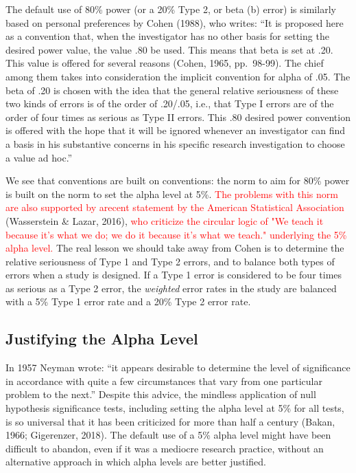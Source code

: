 \documentclass[
  english,
  ,man, a4paper,floatsintext]{apa6}
\begin{document}
The default use of 80\% power (or a 20\% Type 2, or beta (b) error) is similarly based on personal preferences by Cohen (1988), who writes: ``It is proposed here as a convention that, when the investigator has no other basis for setting the desired power value, the value .80 be used. This means that beta is set at .20. This value is offered for several reasons (Cohen, 1965, pp.~98-99). The chief among them takes into consideration the implicit convention for alpha of .05. The beta of .20 is chosen with the idea that the general relative seriousness of these two kinds of errors is of the order of .20/.05, i.e., that Type I errors are of the order of four times as serious as Type II errors. This .80 desired power convention is offered with the hope that it will be ignored whenever an investigator can find a basis in his substantive concerns in his specific research investigation to choose a value ad hoc.''

We see that conventions are built on conventions: the norm to aim for 80\% power is built on the norm to set the alpha level at 5\%. \textcolor{red}{The problems with this norm are also supported by arecent statement by the American Statistical Association} (Wasserstein \& Lazar, 2016), \textcolor{red}{who criticize the circular logic of "We teach it because it’s what we do; we do it because it’s what we teach." underlying the 5\% alpha level.}
The real lesson we should take away from Cohen is to determine the relative seriousness of Type 1 and Type 2 errors, and to balance both types of errors when a study is designed. If a Type 1 error is considered to be four times as serious as a Type 2 error, the \emph{weighted} error rates in the study are balanced with a 5\% Type 1 error rate and a 20\% Type 2 error rate.

\hypertarget{justifying-the-alpha-level}{%
\subsection{Justifying the Alpha Level}\label{justifying-the-alpha-level}}

In 1957 Neyman wrote: ``it appears desirable to determine the level of significance in accordance with quite a few circumstances that vary from one particular problem to the next.'' Despite this advice, the mindless application of null hypothesis significance tests, including setting the alpha level at 5\% for all tests, is so universal that it has been criticized for more than half a century (Bakan, 1966; Gigerenzer, 2018). The default use of a 5\% alpha level might have been difficult to abandon, even if it was a mediocre research practice, without an alternative approach in which alpha levels are better justified.
\end{document}
